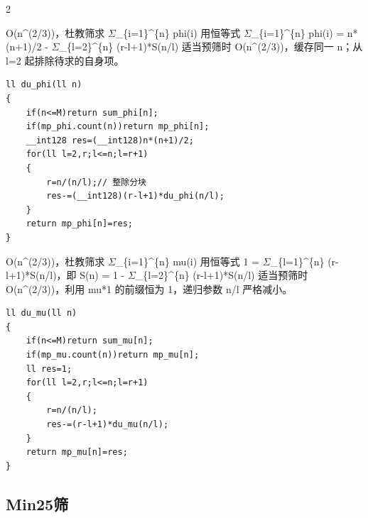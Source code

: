 \documentclass[UTF8,fontset=fandol,a4paper,twoside]{ctexart}
\newcommand{\note}[1]{{\fontsize{10}{12}\selectfont #1\par}}
\begin{document}
\begin{multicols}{2}
\note{O(\allowbreak{}n\textasciicircum{}(\allowbreak{}2/\allowbreak{}3)\allowbreak{})\allowbreak{}，杜教筛求 \ensuremath{\Sigma}\_\{i=\allowbreak{}1\}\textasciicircum{}\{n\} phi(\allowbreak{}i)\allowbreak{} 用恒等式 \ensuremath{\Sigma}\_\{i=\allowbreak{}1\}\textasciicircum{}\{n\} phi(\allowbreak{}i)\allowbreak{} =\allowbreak{} n*(\allowbreak{}n+\allowbreak{}1)\allowbreak{}/\allowbreak{}2 -\allowbreak{} \ensuremath{\Sigma}\_\{l=\allowbreak{}2\}\textasciicircum{}\{n\} (\allowbreak{}r-\allowbreak{}l+\allowbreak{}1)\allowbreak{}*S(\allowbreak{}n/\allowbreak{}l)\allowbreak{} 适当预筛时 O(\allowbreak{}n\textasciicircum{}(\allowbreak{}2/\allowbreak{}3)\allowbreak{})\allowbreak{}，缓存同一 n；从 l=\allowbreak{}2 起排除待求的自身项。}
\begin{lstlisting}
ll du_phi(ll n)
{
    if(n<=M)return sum_phi[n];
    if(mp_phi.count(n))return mp_phi[n];
    __int128 res=(__int128)n*(n+1)/2;
    for(ll l=2,r;l<=n;l=r+1)
    {
        r=n/(n/l);// 整除分块
        res-=(__int128)(r-l+1)*du_phi(n/l);
    }
    return mp_phi[n]=res;
}
\end{lstlisting}
\note{O(\allowbreak{}n\textasciicircum{}(\allowbreak{}2/\allowbreak{}3)\allowbreak{})\allowbreak{}，杜教筛求 \ensuremath{\Sigma}\_\{i=\allowbreak{}1\}\textasciicircum{}\{n\} mu(\allowbreak{}i)\allowbreak{} 用恒等式 1 =\allowbreak{} \ensuremath{\Sigma}\_\{l=\allowbreak{}1\}\textasciicircum{}\{n\} (\allowbreak{}r-\allowbreak{}l+\allowbreak{}1)\allowbreak{}*S(\allowbreak{}n/\allowbreak{}l)\allowbreak{}，即 S(\allowbreak{}n)\allowbreak{} =\allowbreak{} 1 -\allowbreak{} \ensuremath{\Sigma}\_\{l=\allowbreak{}2\}\textasciicircum{}\{n\} (\allowbreak{}r-\allowbreak{}l+\allowbreak{}1)\allowbreak{}*S(\allowbreak{}n/\allowbreak{}l)\allowbreak{} 适当预筛时 O(\allowbreak{}n\textasciicircum{}(\allowbreak{}2/\allowbreak{}3)\allowbreak{})\allowbreak{}，利用 mu*1 的前缀恒为 1，递归参数 n/\allowbreak{}l 严格减小。}
\begin{lstlisting}
ll du_mu(ll n)
{
    if(n<=M)return sum_mu[n];
    if(mp_mu.count(n))return mp_mu[n];
    ll res=1;
    for(ll l=2,r;l<=n;l=r+1)
    {
        r=n/(n/l);
        res-=(r-l+1)*du_mu(n/l);
    }
    return mp_mu[n]=res;
}
\end{lstlisting}
\subsection{Min25筛}


\end{multicols}
\end{document}
